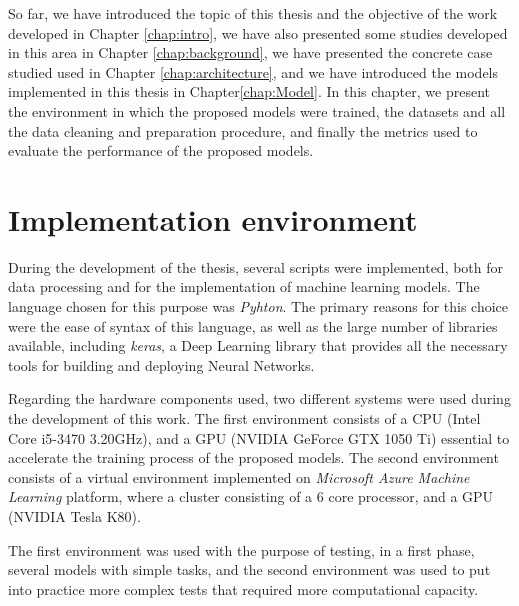 \cleardoublepage
\label{chap:implementation}

So far, we have introduced the topic of this thesis and the objective of the work developed in Chapter \ref{chap:intro}, we have also presented some studies developed in this area in Chapter \ref{chap:background}, we have presented the concrete case studied used in Chapter \ref{chap:architecture}, and we have introduced the models implemented in this thesis in Chapter\ref{chap:Model}.
In this chapter, we present the environment in which the proposed models were trained, the datasets and all the data cleaning and preparation procedure, and finally the metrics used to evaluate the performance of the proposed models.
 

\section{Implementation environment} \label{chap5:enviromnet}

During the development of the thesis, several scripts were implemented, both for data processing and for the implementation of machine learning models. The language chosen for this purpose was \textit{Pyhton}. The primary reasons for this choice were the ease of syntax of this language, as well as the large number of libraries available, including \textit{keras}, a Deep Learning library that provides all the necessary tools for building and deploying Neural Networks.

Regarding the hardware components used, two different systems were used during the development of this work. The first environment consists of a CPU (Intel Core i5-3470 3.20GHz), and a GPU (NVIDIA GeForce GTX 1050 Ti) essential to accelerate the training process of the proposed models. The second environment consists of a virtual environment implemented on \textit{Microsoft Azure Machine Learning} platform, where a cluster consisting of a 6 core processor, and a GPU (NVIDIA Tesla K80).

The first environment was used with the purpose of testing, in a first phase, several models with simple tasks, and the second environment was used to put into practice more complex tests that required more computational capacity.
	

